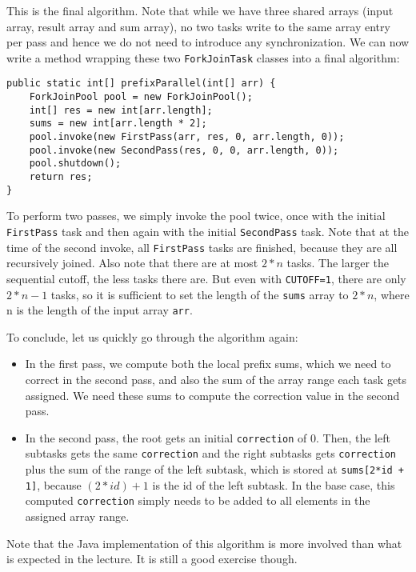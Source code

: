 \documentclass[main.tex]{subfiles}
\begin{document}
\noindent This is the final algorithm. Note that while we have three shared arrays (input array, result array and sum array), no two tasks write to the same array entry per pass and hence we do not need to introduce any synchronization. We can now write a method wrapping these two \texttt{ForkJoinTask} classes into a final algorithm:

\begin{verbatim}
public static int[] prefixParallel(int[] arr) {
    ForkJoinPool pool = new ForkJoinPool();
    int[] res = new int[arr.length];
    sums = new int[arr.length * 2];
    pool.invoke(new FirstPass(arr, res, 0, arr.length, 0));
    pool.invoke(new SecondPass(res, 0, 0, arr.length, 0));
    pool.shutdown();
    return res;
}
\end{verbatim}

\noindent To perform two passes, we simply invoke the pool twice, once with the initial \texttt{FirstPass} task and then again with the initial \texttt{SecondPass} task. Note that at the time of the second invoke, all \texttt{FirstPass} tasks are finished, because they are all recursively joined. Also note that there are at most \(2*n\) tasks. The larger the sequential cutoff, the less tasks there are. But even with \texttt{CUTOFF=1}, there are only \(2*n - 1\) tasks, so it is sufficient to set the length of the \texttt{sums} array to \(2*n\), where n is the length of the input array \texttt{arr}.

To conclude, let us quickly go through the algorithm again:

\begin{itemize}
  \item In the first pass, we compute both the local prefix sums, which we need to correct in the second pass, and also the sum of the array range each task gets assigned. We need these sums to compute the correction value in the second pass.
  \item In the second pass, the root gets an initial \texttt{correction} of 0. Then, the left subtasks gets the same \texttt{correction} and the right subtasks gets \texttt{correction} plus the sum of the range of the left subtask, which is stored at \texttt{sums[2*id + 1]}, because \((2*id)+1\) is the id of the left subtask. In the base case, this computed \texttt{correction} simply needs to be added to all elements in the assigned array range.
\end{itemize}

\noindent Note that the Java implementation of this algorithm is more involved than what is expected in the lecture. It is still a good exercise though.
\end{document}
